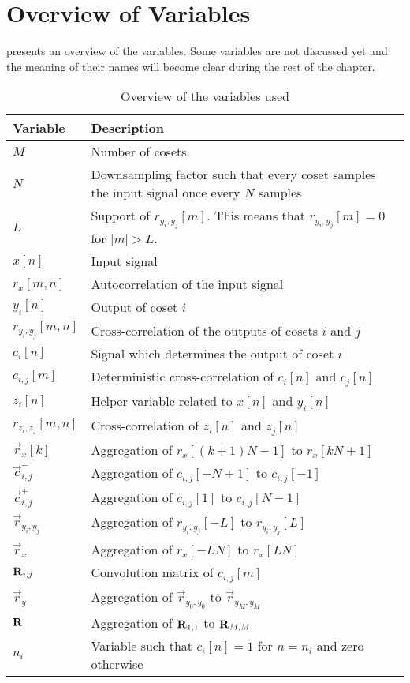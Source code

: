 \documentclass[a4paper, openany, oneside]{memoir}
\begin{document}
\section{Overview of Variables}
 presents an overview of the variables. Some variables are not discussed yet and the meaning of their names will become clear during the rest of the chapter.

\begin{table}[H]
    \centering
    \begin{tabularx}{\textwidth}{lY}
        \textbf{Variable} & \textbf{Description}\\ \hline
        $M$ & Number of cosets \\
        $N$ & Downsampling factor such that every coset samples the input signal once every $N$ samples \\
        $L$ & Support of $r_{y_i,y_j}[m]$. This means that $r_{y_i,y_j}[m]=0$ for $|m| > L$. \\
        $x[n]$ & Input signal \\
        $r_x[m,n]$ & Autocorrelation of the input signal \\
        $y_i[n]$ & Output of coset $i$ \\
        $r_{y_i,y_j}[m,n]$ & Cross-correlation of the outputs of cosets $i$ and $j$ \\
        $c_i[n]$ & Signal which determines the output of coset $i$ \\
        $c_{i,j}[m]$ & Deterministic cross-correlation of $c_i[n]$ and $c_j[n]$ \\
        $z_i[n]$ & Helper variable related to $x[n]$ and $y_i[n]$ \\
        $r_{z_i,z_j}[m,n]$ & Cross-correlation of $z_i[n]$ and $z_j[n]$ \\
        $\vec{r}_x[k]$ & Aggregation of $r_x[(k+1)N-1]$ to $r_x[kN+1]$ \\
        $\vec{c}_{i,j}^-$ & Aggregation of $c_{i,j}[-N+1]$ to $c_{i,j}[-1]$ \\
        $\vec{c}_{i,j}^+$ & Aggregation of $c_{i,j}[1]$ to $c_{i,j}[N-1]$ \\
        $\vec{r}_{y_i,y_j}$ & Aggregation of $r_{y_i,y_j}[-L]$ to $r_{y_i,y_j}[L]$ \\
        $\vec{r}_x$ & Aggregation of $r_x[-LN]$ to $r_x[LN]$ \\
        $\boldsymbol{\mathbf{R}}_{i,j}$ & Convolution matrix of $c_{i,j}[m]$ \\
        $\vec{r}_y$ & Aggregation of $\vec{r}_{y_0,y_0}$ to $\vec{r}_{y_M,y_M}$ \\
        $\boldsymbol{\mathbf{R}}$ & Aggregation of $\boldsymbol{\mathbf{R}}_{1,1}$ to $\boldsymbol{\mathbf{R}}_{M,M}$ \\
        $n_i$ & Variable such that $c_i[n]=1$ for $n=n_i$ and zero otherwise
    \end{tabularx}
    \caption{Overview of the variables used}
    \label{tab:reconstruction-overview-variables}
\end{table}
\end{document}
